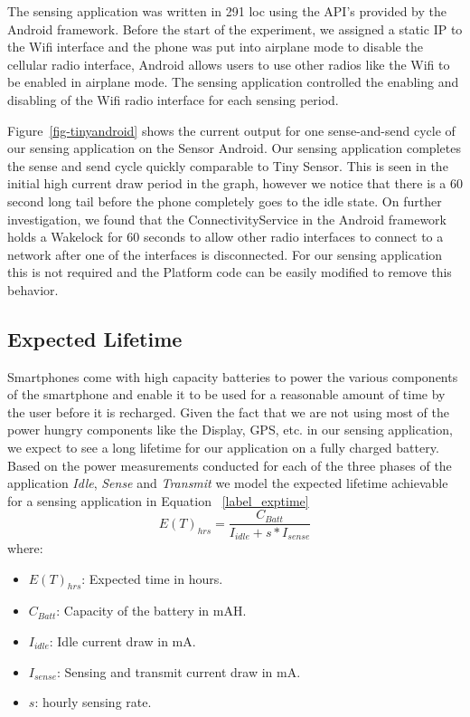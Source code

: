 The sensing application was written in 291 loc using the API's provided by the Android framework. 
Before the start of the experiment, we assigned a static IP to the Wifi interface and the phone was put into airplane mode to 
disable the cellular radio interface, Android allows users to use other radios like the Wifi to be enabled in airplane mode.
The sensing application controlled the enabling and disabling of the Wifi radio interface for each sensing period.

Figure~\ref{fig-tinyandroid} shows the current output for one sense-and-send cycle of our 
sensing application on the Sensor Android. Our sensing application completes the sense and 
send cycle quickly comparable to Tiny Sensor. This is seen in the initial high current draw period 
in the graph, however we notice that there is a 60 second long tail before
the phone completely goes to the idle state. On further investigation, we found that the 
ConnectivityService in the Android framework holds a Wakelock for 60 seconds to allow other 
radio interfaces to connect  to a network after one of the interfaces is disconnected. 
For our sensing application this is not required and the Platform code can be easily modified to remove this behavior.

\subsection{Expected Lifetime}
Smartphones come with high capacity batteries to power the various components of the smartphone and enable it to be used for a reasonable amount of time by the user before it is recharged. Given the fact that we are not using most of the power hungry components like the Display, GPS, etc. in our sensing application, we expect to see a long lifetime for our application on a fully charged battery. Based on the power measurements conducted for each of the three phases of the application \textit{Idle}, \textit{Sense} and \textit{Transmit} we model the expected lifetime achievable for a sensing application in Equation ~\ref{label_exptime} 
\begin{equation}\label{label_exptime}
    E(T)_{hrs} = \frac{C_{Batt}}{I_{idle} + s*I_{sense}}
\end{equation}
where:
{\small
\begin{itemize}[label=]
    \item $E(T)_{hrs}$: Expected time in hours.
    \item $C_{Batt}$: Capacity of the battery in mAH.
    \item $I_{idle}$: Idle current draw in mA.
    \item $I_{sense}$: Sensing and transmit current draw in mA.
    \item $s$: hourly sensing rate.
\end{itemize}
}

